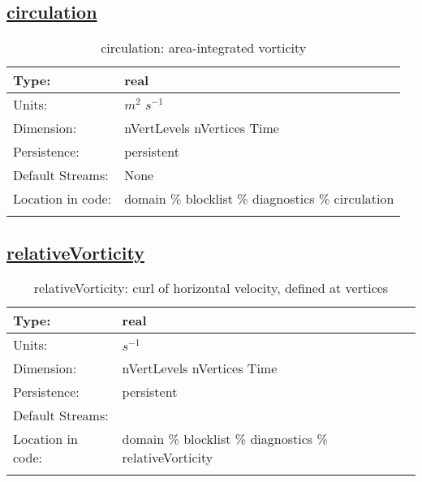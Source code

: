 \subsection[circulation]{\hyperref[sec:var_tab_diagnostics]{circulation}}
\label{subsec:var_sec_diagnostics_circulation}
\begin{center}
\begin{longtable}{| p{2.0in} | p{4.0in} |}
        \hline 
        Type: & real \\
        \hline 
        Units: & $m^2$ $s^{-1}$ \\
        \hline 
        Dimension: & nVertLevels nVertices Time \\
        \hline 
        Persistence: & persistent \\
        \hline 
		 Default Streams: & None \\
        \hline 
		 Location in code: & domain \% blocklist \% diagnostics \% circulation \\
		 \hline 
    \caption{circulation: area-integrated vorticity}
\end{longtable}
\end{center}
\subsection[relativeVorticity]{\hyperref[sec:var_tab_diagnostics]{relativeVorticity}}
\label{subsec:var_sec_diagnostics_relativeVorticity}
\begin{center}
\begin{longtable}{| p{2.0in} | p{4.0in} |}
        \hline 
        Type: & real \\
        \hline 
        Units: & $s^{-1}$ \\
        \hline 
        Dimension: & nVertLevels nVertices Time \\
        \hline 
        Persistence: & persistent \\
        \hline 
		 Default Streams: &  \\
        \hline 
		 Location in code: & domain \% blocklist \% diagnostics \% relativeVorticity \\
		 \hline 
    \caption{relativeVorticity: curl of horizontal velocity, defined at vertices}
\end{longtable}
\end{center}
